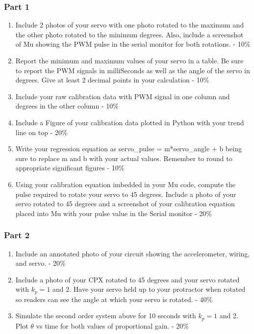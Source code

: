 

\subsubsection{Part 1}
\begin{enumerate}[itemsep=-5pt]
\item Include 2 photos of your servo with one photo rotated to the maximum and the other photo rotated to the minimum degrees. Also, include a screenshot of Mu showing the PWM pulse in the serial monitor for both rotations. - 10\%
\item Report the minimum and maximum values of your servo in a table. Be sure to report the PWM signals in milliSeconds as well as the angle of the servo in degrees. Give at least 2 decimal points in your calculation - 10\%
\item Include your raw calibration data with PWM signal in one column and degrees in the other column - 10\%
\item Include a Figure of your calibration data plotted in Python with your trend line on top - 20\%
\item Write your regression equation as servo\_pulse = m*servo\_angle + b being sure to replace m and b with your actual values. Remember to round to appropriate significant figures - 10\% 
\item Using your calibration equation imbedded in your Mu code, compute the pulse required to rotate your servo to 45 degrees. Include a photo of your servo rotated to 45 degrees and a screenshot of your calibration equation placed into Mu with your pulse value in the Serial monitor - 20\%
\end{enumerate}

\subsubsection{Part 2}
\begin{enumerate}[itemsep=-5pt]
\item Include an annotated photo of your circuit showing the accelerometer, wiring, and servo. - 20\%
\item Include a photo of your CPX rotated to 45 degrees and your servo rotated with $k_p=1$ and 2. Have your servo held up to your protractor when rotated so readers can see the angle at which your servo is rotated. - 40\%
\item Simulate the second order system above for 10 seconds with $k_p=1$ and 2. Plot $\theta$ vs time for both values of proportional gain. - 20\%
\end{enumerate}
